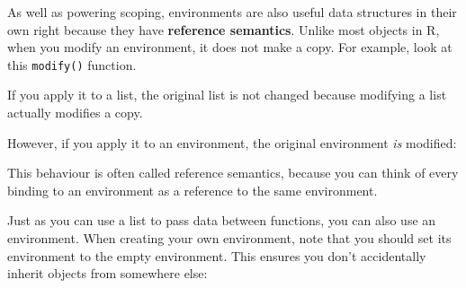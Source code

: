 \documentclass[oneside]{book}
\newenvironment{Shaded}{}{}
\newcommand{\KeywordTok} [1]{\textcolor[rgb]{0.00,0.44,0.13}{{#1}}}
\newcommand{\DecValTok}  [1]{\textcolor[rgb]{0.25,0.63,0.44}{{#1}}}
\newcommand{\StringTok}  [1]{\textcolor[rgb]{0.25,0.44,0.63}{{#1}}}
\newcommand{\CommentTok} [1]{\textcolor[rgb]{0.38,0.63,0.69}{{#1}}}
\newcommand{\NormalTok}  [1]{{#1}}
\begin{document}

As well as powering scoping, environments are also useful data
structures in their own right because they have \textbf{reference
semantics}. Unlike most objects in R, when you modify an environment, it
does not make a copy. For example, look at this \texttt{modify()}
function.

\begin{Shaded}
\end{Shaded}

If you apply it to a list, the original list is not changed because
modifying a list actually modifies a copy.

\begin{Shaded}
\end{Shaded}

However, if you apply it to an environment, the original environment
\emph{is} modified:

\begin{Shaded}
\end{Shaded}

This behaviour is often called reference semantics, because you can
think of every binding to an environment as a reference to the same
environment.

Just as you can use a list to pass data between functions, you can also
use an environment. When creating your own environment, note that you
should set its environment to the empty environment. This ensures you
don't accidentally inherit objects from somewhere else:
\end{document}
